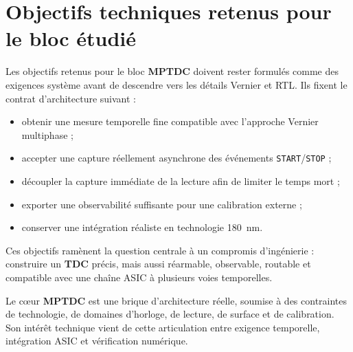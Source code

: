 \section{Objectifs techniques retenus pour le bloc étudié}

Les objectifs retenus pour le bloc \textbf{MPTDC} doivent rester formulés comme des exigences système avant de descendre vers les détails Vernier et RTL. Ils fixent le contrat d'architecture suivant :
\begin{itemize}
    \item obtenir une mesure temporelle fine compatible avec l'approche Vernier multiphase ;
    \item accepter une capture réellement asynchrone des événements \texttt{START}/\texttt{STOP} ;
    \item découpler la capture immédiate de la lecture afin de limiter le temps mort ;
    \item exporter une observabilité suffisante pour une calibration externe ;
    \item conserver une intégration réaliste en technologie \SI{180}{\nano\meter}.
\end{itemize}

Ces objectifs ramènent la question centrale à un compromis d'ingénierie : construire un \textbf{TDC} précis, mais aussi réarmable, observable, routable et compatible avec une chaîne ASIC à plusieurs voies temporelles.

\begin{summaryBox}
Le cœur \textbf{MPTDC} est une brique d'architecture réelle, soumise à des contraintes de technologie, de domaines d'horloge, de lecture, de surface et de calibration. Son intérêt technique vient de cette articulation entre exigence temporelle, intégration ASIC et vérification numérique.
\end{summaryBox}

\clearpage
